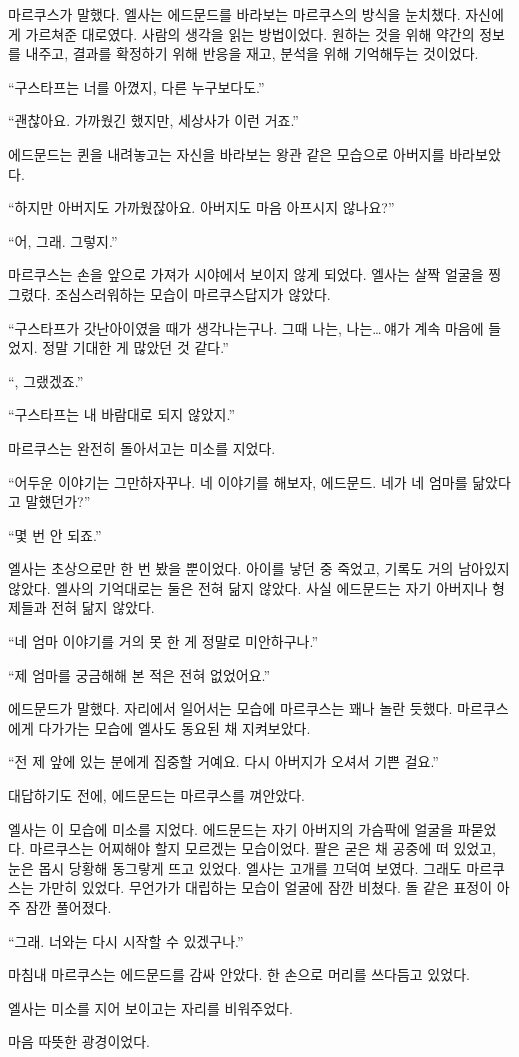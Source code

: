 마르쿠스가 말했다. 엘사는 에드문드를 바라보는 마르쿠스의 방식을 눈치챘다. 자신에게 가르쳐준 대로였다. 사람의 생각을 읽는 방법이었다. 원하는 것을 위해 약간의 정보를 내주고, 결과를 확정하기 위해 반응을 재고, 분석을 위해 기억해두는 것이었다.

``구스타프는 너를 아꼈지, 다른 누구보다도.''

``괜찮아요. 가까웠긴 했지만, 세상사가 이런 거죠.''

에드문드는 퀸을 내려놓고는 자신을 바라보는 왕관 같은 모습으로 아버지를 바라보았다.

``하지만 아버지도 가까웠잖아요. 아버지도 마음 아프시지 않나요?''

``어, 그래. 그렇지.''

마르쿠스는 손을 앞으로 가져가 시야에서 보이지 않게 되었다. 엘사는 살짝 얼굴을 찡그렸다. 조심스러워하는 모습이 마르쿠스답지가 않았다.

``구스타프가 갓난아이였을 때가 생각나는구나. 그때 나는, 나는\ldots\,얘가 계속 마음에 들었지. 정말 기대한 게 많았던 것 같다.''

``, 그랬겠죠.''

``구스타프는 내 바람대로 되지 않았지.''

마르쿠스는 완전히 돌아서고는 미소를 지었다.

``어두운 이야기는 그만하자꾸나. 네 이야기를 해보자, 에드문드. 네가 네 엄마를 닮았다고 말했던가?''

``몇 번 안 되죠.''

엘사는 초상으로만 한 번 봤을 뿐이었다. 아이를 낳던 중 죽었고, 기록도 거의 남아있지 않았다. 엘사의 기억대로는 둘은 전혀 닮지 않았다. 사실 에드문드는 자기 아버지나 형제들과 전혀 닮지 않았다.

``네 엄마 이야기를 거의 못 한 게 정말로 미안하구나.''

``제 엄마를 궁금해해 본 적은 전혀 없었어요.''

에드문드가 말했다. 자리에서 일어서는 모습에 마르쿠스는 꽤나 놀란 듯했다. 마르쿠스에게 다가가는 모습에 엘사도 동요된 채 지켜보았다.

``전 제 앞에 있는 분에게 집중할 거예요. 다시 아버지가 오셔서 기쁜 걸요.''

대답하기도 전에, 에드문드는 마르쿠스를 껴안았다.

엘사는 이 모습에 미소를 지었다. 에드문드는 자기 아버지의 가슴팍에 얼굴을 파묻었다. 마르쿠스는 어찌해야 할지 모르겠는 모습이었다. 팔은 굳은 채 공중에 떠 있었고, 눈은 몹시 당황해 동그랗게 뜨고 있었다. 엘사는 고개를 끄덕여 보였다. 그래도 마르쿠스는 가만히 있었다. 무언가가 대립하는 모습이 얼굴에 잠깐 비쳤다. 돌 같은 표정이 아주 잠깐 풀어졌다.

``그래. 너와는 다시 시작할 수 있겠구나.''

마침내 마르쿠스는 에드문드를 감싸 안았다. 한 손으로 머리를 쓰다듬고 있었다.

엘사는 미소를 지어 보이고는 자리를 비워주었다.

마음 따뜻한 광경이었다.

